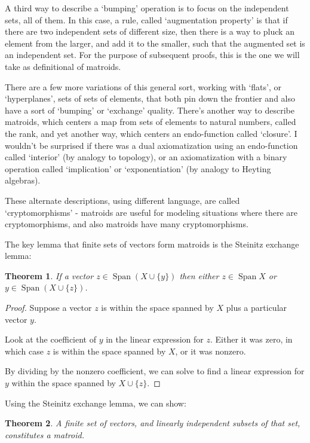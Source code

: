 \documentclass[11pt, noamsfonts]{amsart}
\DeclareMathOperator{\Span}{Span}
\newtheorem{theorem}{Theorem}
\begin{document}
A third way to describe a `bumping' operation is to focus on the independent sets, all of them. In this case, a rule, called `augmentation property' is that if there are two independent sets of different size, then there is a way to pluck an element from the larger, and add it to the smaller, such that the augmented set is an independent set. For the purpose of subsequent proofs, this is the one we will take as definitional of matroids.

There are a few more variations of this general sort, working with `flats', or `hyperplanes', sets of sets of elements, that both pin down the frontier and also have a sort of `bumping' or `exchange' quality. There's another way to describe matroids, which centers a map from sets of elements to natural numbers, called the rank, and yet another way, which centers an endo-function called `closure'. I wouldn't be surprised if there was a dual axiomatization using an endo-function called `interior' (by analogy to topology), or an axiomatization with a binary operation called `implication' or `exponentiation' (by analogy to Heyting algebras).

These alternate descriptions, using different language, are called `cryptomorphisms' - matroids are useful for modeling situations where there are cryptomorphisms, and also matroids have many cryptomorphisms.

The key lemma that finite sets of vectors form matroids is the Steinitz exchange lemma:

\begin{theorem}
If a vector \(z \in \Span (X \cup \{y\})\) then either \(z \in \Span X\) or \(y \in \Span (X \cup \{z\})\).
\end{theorem}

\begin{proof}
Suppose a vector \(z\) is within the space spanned by \(X\) plus a particular vector \(y\).

Look at the coefficient of \(y\) in the linear expression for \(z\).
Either it was zero, in which case \(z\) is within the space spanned by \(X\), or it was nonzero.

By dividing by the nonzero coefficient, we can solve to find a linear expression for \(y\) within the space spanned by \(X \cup \{z\}\).
\end{proof}

Using the Steinitz exchange lemma, we can show:

\begin{theorem}
A finite set of vectors, and linearly independent subsets of that set, constitutes a matroid. 
\end{theorem}
\end{document}
